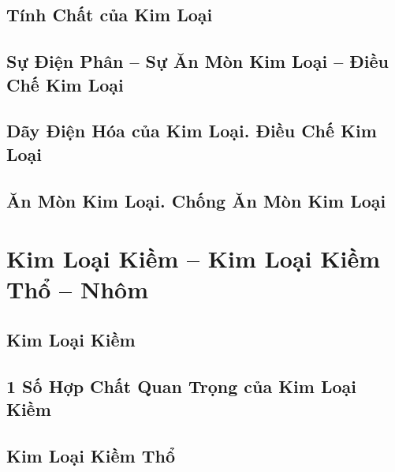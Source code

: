 \documentclass{article}
\numberwithin{equation}{section}
\begin{document}
\subsection{Tính Chất của Kim Loại}


\subsection{Sự Điện Phân -- Sự Ăn Mòn Kim Loại -- Điều Chế Kim Loại}


\subsection{Dãy Điện Hóa của Kim Loại. Điều Chế Kim Loại}


\subsection{Ăn Mòn Kim Loại. Chống Ăn Mòn Kim Loại}


\section{Kim Loại Kiềm -- Kim Loại Kiềm Thổ -- Nhôm}

\subsection{Kim Loại Kiềm}


\subsection{1 Số Hợp Chất Quan Trọng của Kim Loại Kiềm}


\subsection{Kim Loại Kiềm Thổ}
\end{document}
